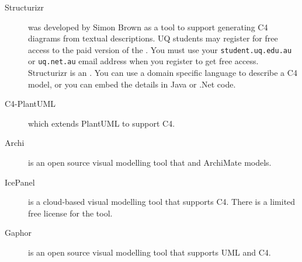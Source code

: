 \begin{description}
    \item[Structurizr]
        was developed by Simon Brown as a tool to support generating C4 diagrams from textual descriptions.
        UQ students may register for free access to the paid version of the .
        You must use your \texttt{student.uq.edu.au} or \texttt{uq.net.au} email address when you register to get free access.
        Structurizr is an .
        You can use a domain specific language to describe a C4 model, or you can embed the details in Java or .Net code.
    \item[C4-PlantUML] which extends PlantUML to support C4.
    \item[Archi] is an open source visual modelling tool that
         and ArchiMate models.
    \item[IcePanel] is a cloud-based visual modelling tool that supports C4. There is a limited free license for the tool.
    \item[Gaphor] is an open source visual modelling tool that supports UML and C4.
\end{description}